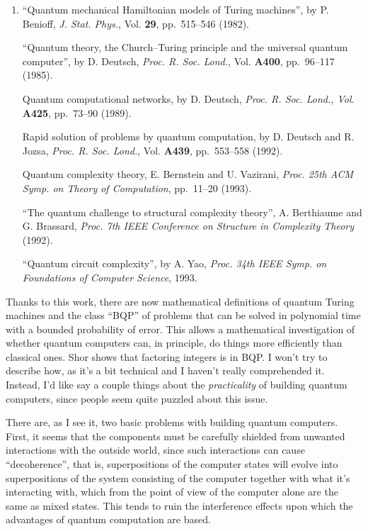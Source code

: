 \documentclass{article}
\begin{document}
\begin{enumerate}
\def\labelenumi{\arabic{enumi})}
\setcounter{enumi}{2}
\item
  ``Quantum mechanical Hamiltonian models of Turing machines'', by P.
  Benioff, \emph{J. Stat. Phys.}, Vol. \textbf{29}, pp.~515--546 (1982).

  ``Quantum theory, the Church--Turing principle and the universal
  quantum computer'', by D. Deutsch, \emph{Proc. R. Soc. Lond.}, Vol.
  \textbf{A400}, pp.~96--117 (1985).

  Quantum computational networks, by D. Deutsch, \emph{Proc. R. Soc.
  Lond., Vol}. \textbf{A425}, pp.~73--90 (1989).

  Rapid solution of problems by quantum computation, by D. Deutsch and
  R. Jozsa, \emph{Proc. R. Soc. Lond.}, Vol. \textbf{A439}, pp.~553--558
  (1992).

  Quantum complexity theory, E. Bernstein and U. Vazirani, \emph{Proc.
  25th ACM Symp. on Theory of Computation}, pp.~11--20 (1993).

  ``The quantum challenge to structural complexity theory'', A.
  Berthiaume and G. Brassard, \emph{Proc. 7th IEEE Conference on
  Structure in Complexity Theory} (1992).

  ``Quantum circuit complexity'', by A. Yao, \emph{Proc. 34th IEEE Symp.
  on Foundations of Computer Science}, 1993.
\end{enumerate}

Thanks to this work, there are now mathematical definitions of quantum
Turing machines and the class ``BQP'' of problems that can be solved in
polynomial time with a bounded probability of error. This allows a
mathematical investigation of whether quantum computers can, in
principle, do things more efficiently than classical ones. Shor shows
that factoring integers is in BQP. I won't try to describe how, as it's
a bit technical and I haven't really comprehended it. Instead, I'd like
say a couple things about the \emph{practicality} of building quantum
computers, since people seem quite puzzled about this issue.

There are, as I see it, two basic problems with building quantum
computers. First, it seems that the components must be carefully
shielded from unwanted interactions with the outside world, since such
interactions can cause ``decoherence'', that is, superpositions of the
computer states will evolve into superpositions of the system consisting
of the computer together with what it's interacting with, which from the
point of view of the computer alone are the same as mixed states. This
tends to ruin the interference effects upon which the advantages of
quantum computation are based.
\end{document}
